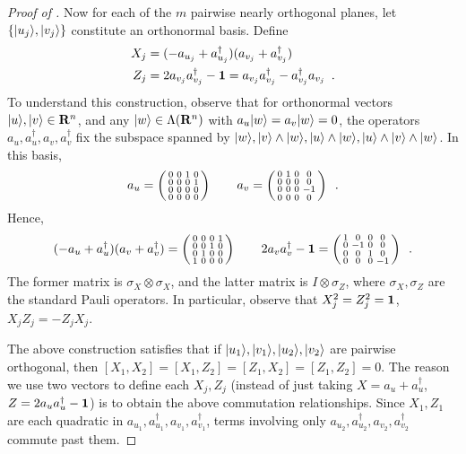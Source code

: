 \documentclass[preprintnumbers,11pt,onecolumn]{article}
\begin{document}
\begin{proof}[Proof of ]
Now for each of the $m$ pairwise nearly orthogonal planes, let $\{ {|u_j\rangle}, {|v_j\rangle} \}$ constitute an orthonormal basis.  Define 
\begin{equation}\begin{split}
X_j &= (-a_{u_j} + a_{u_j}^\dagger)(a_{v_j} + a_{v_j}^\dagger) \\
Z_j &= 2 a_{v_j} a_{v_j}^\dagger - \boldsymbol{1} = a_{v_j} a_{v_j}^\dagger - a_{v_j}^\dagger a_{v_j}
 \enspace .
\end{split}\end{equation}
To understand this construction, observe that for orthonormal vectors ${|u\rangle}, {|v\rangle} \in {\bf R}^n$, and any ${|w\rangle} \in \Lambda({\bf R}^n)$ with $a_u {|w\rangle} = a_v {|w\rangle} = 0$, the operators $a_u, a_u^\dagger, a_v, a_v^\dagger$ fix the subspace spanned by ${|w\rangle}, {|v\rangle} \wedge {|w\rangle}, {|u\rangle} \wedge {|w\rangle}, {|u\rangle} \wedge {|v\rangle} \wedge {|w\rangle}$.  In this basis, 
\begin{equation*}
a_u = \left(\begin{smallmatrix}0&0&1&0\\0&0&0&1\\0&0&0&0\\0&0&0&0\end{smallmatrix}\right)
\qquad 
a_v = \left(\begin{smallmatrix}0&1&0&0\\0&0&0&0\\0&0&0&-1\\0&0&0&0\end{smallmatrix}\right)
 \enspace .
\end{equation*}
Hence, 
\begin{gather*}
(-a_u + a_u^\dagger)(a_v + a_v^\dagger) = \left(\begin{smallmatrix}0&0&0&1\\0&0&1&0\\0&1&0&0\\1&0&0&0\end{smallmatrix}\right)
\qquad
2 a_v a_v^\dagger - \boldsymbol{1} = \left(\begin{smallmatrix}1&0&0&0\\0&-1&0&0\\0&0&1&0\\0&0&0&-1\end{smallmatrix}\right)
 \enspace .
\end{gather*}
The former matrix is $\sigma_X \otimes \sigma_X$, and the latter matrix is $I \otimes \sigma_Z$, where $\sigma_X, \sigma_Z$ are the standard Pauli operators.  In particular, observe that $X_j^2 = Z_j^2 = \boldsymbol{1}$, $X_j Z_j = -Z_j X_j$.  

The above construction satisfies that if ${|u_1\rangle}, {|v_1\rangle}, {|u_2\rangle}, {|v_2\rangle}$ are pairwise orthogonal, then $[X_1, X_2] = [X_1, Z_2] = [Z_1, X_2] = [Z_1, Z_2] = 0$.  The reason we use two vectors to define each $X_j, Z_j$ (instead of just taking $X = a_u + a_u^\dagger$, $Z = 2 a_u a_u^\dagger - \boldsymbol{1}$) is to obtain the above commutation relationships.  Since $X_1, Z_1$ are each quadratic in $a_{u_1}, a_{u_1}^\dagger, a_{v_1}, a_{v_1}^\dagger$, terms involving only $a_{u_2}, a_{u_2}^\dagger, a_{v_2}, a_{v_2}^\dagger$ commute past them.  


\end{proof}
\end{document}
